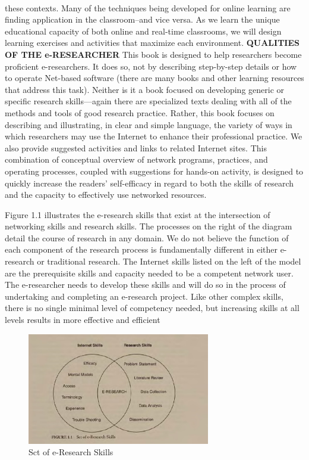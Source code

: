 ‎\documentclass[a4paper,12pt]{book}‎
\begin{document}
these contexts. Many of the techniques being developed for online learning are finding application in the classroom--and vice versa. As we learn the unique educational capacity of both online and real-time classrooms, we will design learning exercises and activities that maximize each environment.
\vspace{1mm}
\hspace{-2.5cm}
\textbf{QUALITIES OF THE e-RESEARCHER}
\vspace{2mm}
This book is designed to help researchers become proficient e-researchers. It does so, not by describing step-by-step details or how to operate Net-based software (there are many books and other learning resources that address this task). Neither is it a book focused on developing generic or specific research skills—again there are specialized texts dealing with all of the methods and tools of good research practice. Rather, this book focuses on describing and illustrating, in clear and simple language, the variety of ways in which researchers may use the Internet to enhance their professional practice. We also provide suggested activities and links to related Internet sites. This combination of conceptual overview of network programs, practices, and operating processes, coupled with suggestions for hands-on activity, is designed to quickly increase the readers' self-efficacy in regard to both the skills of research and the capacity to effectively use networked resources.

Figure 1.1 illustrates the e-research skills that exist at the intersection of networking skills and research skills. The processes on the right of the diagram detail the course of research in any domain. We do not believe the function of each component of the research process is fundamentally different in either e-research or traditional research. The Internet skills listed on the left of the model are the prerequisite skills and capacity needed to be a competent network user. The e-researcher needs to develop these skills and will do so in the process of undertaking and completing an e-research project. Like other complex skills, there is no single minimal level of competency needed, but increasing skills at all levels results in more effective and efficient
\begin{figure}[tbh]
\begin{center}
\includegraphics[width=8cm]{bv.eps}
\caption{Sct of e-Research Skills}
\label{fig_name}
\end{center}
\end{figure}
\vspace{2mm}
\end{document}
